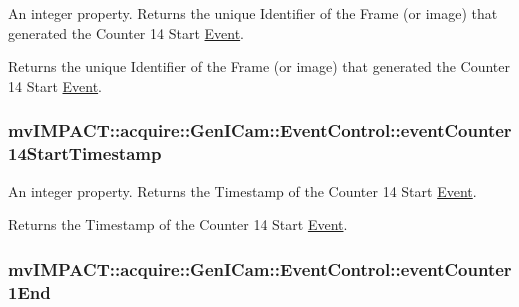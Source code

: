 An integer property. Returns the unique Identifier of the Frame (or image) that generated the Counter 14 Start \hyperlink{classmv_i_m_p_a_c_t_1_1acquire_1_1_event}{Event}. 

Returns the unique Identifier of the Frame (or image) that generated the Counter 14 Start \hyperlink{classmv_i_m_p_a_c_t_1_1acquire_1_1_event}{Event}. \hypertarget{classmv_i_m_p_a_c_t_1_1acquire_1_1_gen_i_cam_1_1_event_control_aec1089ba430f085deb8d709305bdcdab}{
\subsubsection[{event\+Counter14\+Start\+Timestamp}]{ mv\+I\+M\+P\+A\+C\+T\+::acquire\+::\+Gen\+I\+Cam\+::\+Event\+Control\+::event\+Counter14\+Start\+Timestamp}}\label{classmv_i_m_p_a_c_t_1_1acquire_1_1_gen_i_cam_1_1_event_control_aec1089ba430f085deb8d709305bdcdab}


An integer property. Returns the Timestamp of the Counter 14 Start \hyperlink{classmv_i_m_p_a_c_t_1_1acquire_1_1_event}{Event}. 

Returns the Timestamp of the Counter 14 Start \hyperlink{classmv_i_m_p_a_c_t_1_1acquire_1_1_event}{Event}. \hypertarget{classmv_i_m_p_a_c_t_1_1acquire_1_1_gen_i_cam_1_1_event_control_a011b17aced94eef7d68e333db99008e8}{
\subsubsection[{event\+Counter1\+End}]{ mv\+I\+M\+P\+A\+C\+T\+::acquire\+::\+Gen\+I\+Cam\+::\+Event\+Control\+::event\+Counter1\+End}}\label{classmv_i_m_p_a_c_t_1_1acquire_1_1_gen_i_cam_1_1_event_control_a011b17aced94eef7d68e333db99008e8}


